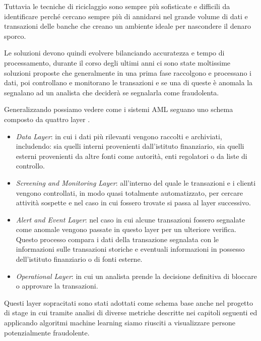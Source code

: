 Tuttavia le tecniche di riciclaggio sono sempre più sofisticate e difficili da identificare perché cercano sempre più di annidarsi nel grande volume di dati e transazioni delle banche che creano un ambiente ideale per nascondere il denaro sporco. 

Le soluzioni devono quindi evolvere bilanciando accuratezza e tempo di processamento, durante il corso degli ultimi anni ci sono state moltissime soluzioni proposte che generalmente in una prima fase raccolgono e processano i dati, poi controllano e monitorano le transazioni e se una di queste è anomala la segnalano ad un analista che deciderà se segnalarla come fraudolenta.

Generalizzando possiamo vedere come i sistemi AML seguano uno schema composto da quattro layer \citep{han2020artificial}.

\begin{itemize}
\item \textit{Data Layer}: in cui i dati più rilevanti vengono raccolti e archiviati, includendo: sia quelli interni provenienti dall'istituto finanziario, sia quelli esterni provenienti da altre fonti come autorità, enti regolatori o da liste di controllo.
\item \textit{Screening and Monitoring Layer}: all'interno del quale le transazioni e i clienti vengono controllati, in modo quasi totalmente automatizzato, per cercare attività sospette e nel caso in cui fossero trovate si passa al layer successivo.
\item \textit{Alert and Event Layer}: nel caso in cui alcune transazioni fossero segnalate come anomale vengono passate in questo layer per un ulteriore verifica. Questo processo compara i dati della transazione segnalata con le informazioni sulle transazioni storiche e eventuali informazioni in possesso dell'istituto finanziario o di fonti esterne.
\item \textit{Operational Layer}: in cui un analista prende la decisione definitiva di bloccare o approvare la transazioni.
\end{itemize}

Questi layer sopracitati sono stati adottati come schema base anche nel progetto di stage in cui tramite analisi di diverse metriche descritte nei capitoli seguenti ed applicando algoritmi machine learning siamo riusciti a visualizzare persone potenzialmente fraudolente.
